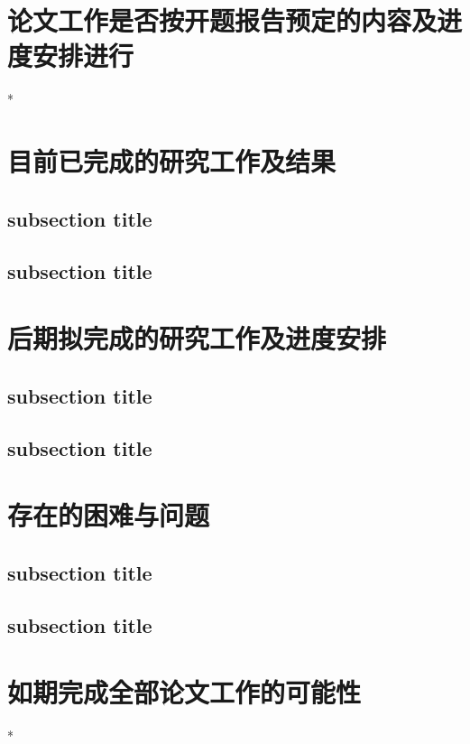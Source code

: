 \section{论文工作是否按开题报告预定的内容及进度安排进行}*

\lipsum[1]

\section{目前已完成的研究工作及结果}

\subsection{subsection title}
\lipsum[2-3]
\subsection{subsection title}
\lipsum[4-5]

\section{后期拟完成的研究工作及进度安排}

\subsection{subsection title}
\lipsum[2-3]
\subsection{subsection title}
\lipsum[4-5]

\section{存在的困难与问题}

\subsection{subsection title}
\lipsum[2-3]
\subsection{subsection title}
\lipsum[4-5]

\section{如期完成全部论文工作的可能性}*

